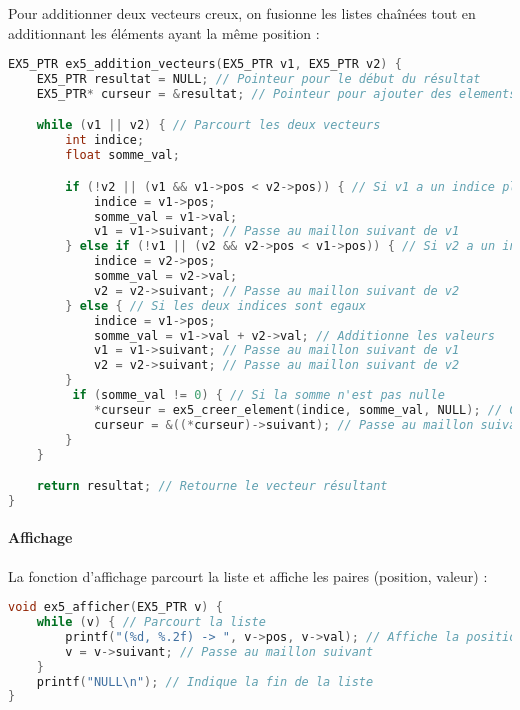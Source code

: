 \documentclass[a4paper,12pt]{article}
\begin{document}
Pour additionner deux vecteurs creux, on fusionne les listes chaînées tout en additionnant les éléments ayant la même position :

\begin{lstlisting}[language=C, caption={Addition de deux vecteurs creux}]
EX5_PTR ex5_addition_vecteurs(EX5_PTR v1, EX5_PTR v2) {
    EX5_PTR resultat = NULL; // Pointeur pour le début du résultat
    EX5_PTR* curseur = &resultat; // Pointeur pour ajouter des elements au résultat

    while (v1 || v2) { // Parcourt les deux vecteurs
        int indice;
        float somme_val;

        if (!v2 || (v1 && v1->pos < v2->pos)) { // Si v1 a un indice plus petit
            indice = v1->pos;
            somme_val = v1->val;
            v1 = v1->suivant; // Passe au maillon suivant de v1
        } else if (!v1 || (v2 && v2->pos < v1->pos)) { // Si v2 a un indice plus petit
            indice = v2->pos;
            somme_val = v2->val;
            v2 = v2->suivant; // Passe au maillon suivant de v2
        } else { // Si les deux indices sont egaux
            indice = v1->pos;
            somme_val = v1->val + v2->val; // Additionne les valeurs
            v1 = v1->suivant; // Passe au maillon suivant de v1
            v2 = v2->suivant; // Passe au maillon suivant de v2
        }
         if (somme_val != 0) { // Si la somme n'est pas nulle
            *curseur = ex5_creer_element(indice, somme_val, NULL); // Cree un nouveau maillon
            curseur = &((*curseur)->suivant); // Passe au maillon suivant du résultat
        }
    }

    return resultat; // Retourne le vecteur résultant
}
\end{lstlisting}

\paragraph{Affichage}

La fonction d’affichage parcourt la liste et affiche les paires (position, valeur) :

\begin{lstlisting}[language=C, caption={Affichage d’un vecteur creux}]
void ex5_afficher(EX5_PTR v) {
    while (v) { // Parcourt la liste
        printf("(%d, %.2f) -> ", v->pos, v->val); // Affiche la position et la valeur
        v = v->suivant; // Passe au maillon suivant
    }
    printf("NULL\n"); // Indique la fin de la liste
}
\end{lstlisting}
\end{document}
